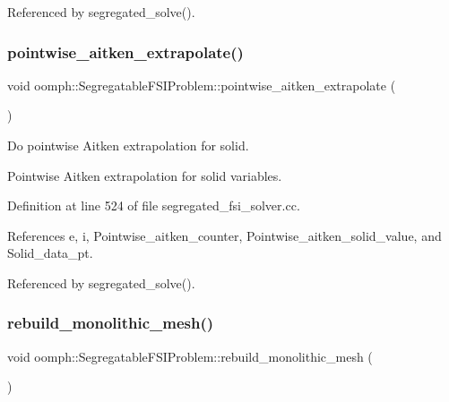 Referenced by segregated\+\_\+solve().

\mbox{\label{classoomph_1_1SegregatableFSIProblem_a99a457e1b3c17e9a08590db163eb7118}} 
\subsubsection{\texorpdfstring{pointwise\+\_\+aitken\+\_\+extrapolate()}{pointwise\_aitken\_extrapolate()}}
{\footnotesize\ttfamily void oomph\+::\+Segregatable\+F\+S\+I\+Problem\+::pointwise\+\_\+aitken\+\_\+extrapolate (\begin{DoxyParamCaption}{ }\end{DoxyParamCaption})\hspace{0.3cm}{\ttfamily [protected]}}



Do pointwise Aitken extrapolation for solid. 

Pointwise Aitken extrapolation for solid variables. 

Definition at line 524 of file segregated\+\_\+fsi\+\_\+solver.\+cc.



References e, i, Pointwise\+\_\+aitken\+\_\+counter, Pointwise\+\_\+aitken\+\_\+solid\+\_\+value, and Solid\+\_\+data\+\_\+pt.



Referenced by segregated\+\_\+solve().

\mbox{\label{classoomph_1_1SegregatableFSIProblem_a61cad9a0a75f2999c0529caa9cac2b73}} 
\subsubsection{\texorpdfstring{rebuild\+\_\+monolithic\+\_\+mesh()}{rebuild\_monolithic\_mesh()}}
{\footnotesize\ttfamily void oomph\+::\+Segregatable\+F\+S\+I\+Problem\+::rebuild\+\_\+monolithic\+\_\+mesh (\begin{DoxyParamCaption}{ }\end{DoxyParamCaption})\hspace{0.3cm}{\ttfamily [protected]}}



